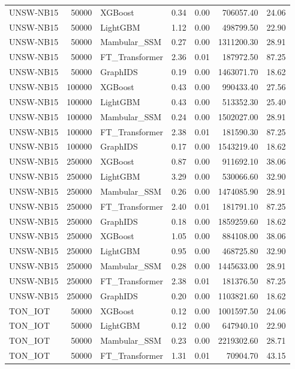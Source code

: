 \begin{table}[t]
\begin{tabular}{lrlrrrr}
UNSW-NB15 & 50000 & XGBoost & 0.34 & 0.00 & 706057.40 & 24.06 \\
UNSW-NB15 & 50000 & LightGBM & 1.12 & 0.00 & 498799.50 & 22.90 \\
UNSW-NB15 & 50000 & Mambular_SSM & 0.27 & 0.00 & 1311200.30 & 28.91 \\
UNSW-NB15 & 50000 & FT_Transformer & 2.36 & 0.01 & 187972.50 & 87.25 \\
UNSW-NB15 & 50000 & GraphIDS & 0.19 & 0.00 & 1463071.70 & 18.62 \\
UNSW-NB15 & 100000 & XGBoost & 0.43 & 0.00 & 990433.40 & 27.56 \\
UNSW-NB15 & 100000 & LightGBM & 0.43 & 0.00 & 513352.30 & 25.40 \\
UNSW-NB15 & 100000 & Mambular_SSM & 0.24 & 0.00 & 1502027.00 & 28.91 \\
UNSW-NB15 & 100000 & FT_Transformer & 2.38 & 0.01 & 181590.30 & 87.25 \\
UNSW-NB15 & 100000 & GraphIDS & 0.17 & 0.00 & 1543219.40 & 18.62 \\
UNSW-NB15 & 250000 & XGBoost & 0.87 & 0.00 & 911692.10 & 38.06 \\
UNSW-NB15 & 250000 & LightGBM & 3.29 & 0.00 & 530066.60 & 32.90 \\
UNSW-NB15 & 250000 & Mambular_SSM & 0.26 & 0.00 & 1474085.90 & 28.91 \\
UNSW-NB15 & 250000 & FT_Transformer & 2.40 & 0.01 & 181791.10 & 87.25 \\
UNSW-NB15 & 250000 & GraphIDS & 0.18 & 0.00 & 1859259.60 & 18.62 \\
UNSW-NB15 & 250000 & XGBoost & 1.05 & 0.00 & 884108.00 & 38.06 \\
UNSW-NB15 & 250000 & LightGBM & 0.95 & 0.00 & 468725.80 & 32.90 \\
UNSW-NB15 & 250000 & Mambular_SSM & 0.28 & 0.00 & 1445633.00 & 28.91 \\
UNSW-NB15 & 250000 & FT_Transformer & 2.38 & 0.01 & 181376.50 & 87.25 \\
UNSW-NB15 & 250000 & GraphIDS & 0.20 & 0.00 & 1103821.60 & 18.62 \\
TON_IOT & 50000 & XGBoost & 0.12 & 0.00 & 1001597.50 & 24.06 \\
TON_IOT & 50000 & LightGBM & 0.12 & 0.00 & 647940.10 & 22.90 \\
TON_IOT & 50000 & Mambular_SSM & 0.23 & 0.00 & 2219302.60 & 28.71 \\
TON_IOT & 50000 & FT_Transformer & 1.31 & 0.01 & 70904.70 & 43.15 \\

\end{tabular}
\end{table}
